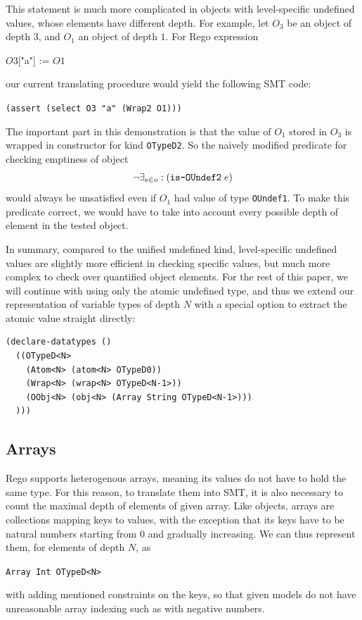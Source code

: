   This statement is much more complicated in objects with level-specific undefined values, whose elements have different depth.
  For example, let $O_3$ be an object of depth $3$, and $O_1$ an object of depth $1$.
  For Rego expression
  \begin{center}
    $O3$["a"] := $O1$
  \end{center}
  our current translating procedure would yield the following SMT code:
  \begin{center}
    \texttt{(assert (select O3 "a" (Wrap2 O1)))}
  \end{center}
  The important part in this demonstration is that the value of $O_1$ stored in $O_3$ is wrapped in constructor for kind \texttt{OTypeD2}.
  So the naively modified predicate for checking emptiness of object
  $$
  \neg\exists_{e \in o}: (\texttt{is-OUndef2} \hspace{1mm} e)
  $$
  would always be unsatisfied even if $O_1$ had value of type \texttt{OUndef1}.
  To make this predicate correct, we would have to take into account every possible depth of element in the tested object.



  In summary, compared to the unified undefined kind, level-specific undefined values are slightly more efficient in checking specific values, but much more complex to check over quantified object elements.
  For the rest of this paper, we will continue with using only the atomic undefined type, and thus we extend our representation of variable types of depth $N$ with a special option to extract the atomic value straight directly:
\begin{lstlisting}[language=lisp]
(declare-datatypes ()
  ((OTypeD<N>
    (Atom<N> (atom<N> OTypeD0))
    (Wrap<N> (wrap<N> OTypeD<N-1>))
    (OObj<N> (obj<N> (Array String OTypeD<N-1>)))
  )))
\end{lstlisting}
  
  \subsection{Arrays}

  Rego supports heterogenous arrays, meaning its values do not have to hold the same type.
  For this reason, to translate them into SMT, it is also necessary to count the maximal depth of elements of given array.
  Like objects, arrays are collections mapping keys to values, with the exception that its keys have to be natural numbers starting from 0 and gradually increasing.
  We can thus represent them, for elements of depth $N$, as
  \begin{center}
    \texttt{Array Int OTypeD<N>}
  \end{center}
  with adding mentioned constraints on the keys, so that given models do not have unreasonable array indexing such as with negative numbers.

